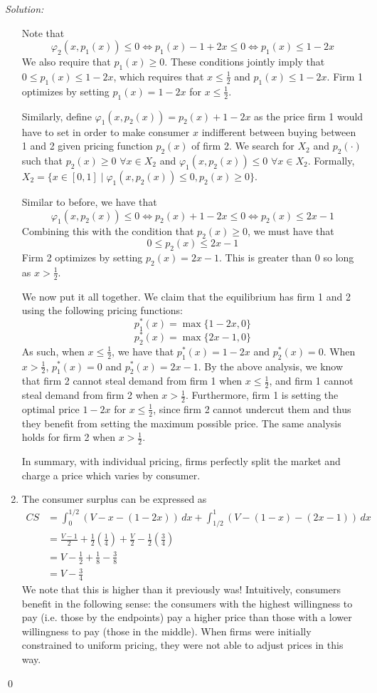\documentclass[12pt]{article}
\newenvironment{sol}
    {\emph{Solution:}
    }
    {
    \qed
    }
\begin{document}
\begin{sol}
\begin{enumerate}[label=\alph*) ]
        Note that
        \[\varphi_2(x, p_1(x)) \leq 0 \iff  p_1(x) - 1 + 2x \leq 0 \iff p_1(x) \leq 1 - 2x\]
        We also require that $p_1(x) \geq 0$. These conditions jointly imply that $0 \leq p_1(x) \leq 1-2x$, which requires that $x \leq \frac{1}{2}$ and $p_1(x) \leq 1-2x$. Firm 1 optimizes by setting $p_1(x) = 1-2x$ for $x \leq \frac{1}{2}$. 

        Similarly, define $\varphi_1(x, p_2(x)) = p_2(x) + 1 - 2x$ as the price firm 1 would have to set in order to make consumer $x$ indifferent between buying between 1 and 2 given pricing function $p_2(x)$ of firm 2. We search for $X_2$ and $p_2(\cdot)$ such that $p_2(x) \geq 0$ $\forall x \in X_2$ and $\varphi_1(x, p_2(x)) \leq 0$ $\forall x \in X_2$. Formally, $X_2 = \{x \in [0,1] \mid \varphi_1(x, p_2(x)) \leq 0, p_2(x) \geq 0\}$.

        Similar to before, we have that 
        \[\varphi_1(x, p_2(x)) \leq 0 \iff p_2(x) + 1 - 2x \leq 0 \iff p_2(x) \leq 2x - 1\]
        Combining this with the condition that $p_2(x) \geq 0$, we must have that
        \[0 \leq p_2(x) \leq 2x - 1\]
        Firm 2 optimizes by setting $p_2(x) = 2x-1$. This is greater than 0 so long as $x > \frac{1}{2}$. 

        We now put it all together. We claim that the equilibrium has firm 1 and 2 using the following pricing functions:
        \[p_1^*(x) = \max\{1 - 2x, 0\}\]
        \[p_2^*(x) = \max\{2x-1, 0\}\]
        As such, when $x \leq \frac{1}{2}$, we have that $p_1^*(x) = 1-2x$ and $p_2^*(x) = 0$. When $x > \frac{1}{2}$, $p_1^*(x) = 0$ and $p_2^*(x) = 2x-1$. By the above analysis, we know that firm 2 cannot steal demand from firm 1 when $x \leq \frac{1}{2}$, and firm 1 cannot steal demand from firm 2 when $x > \frac{1}{2}$. Furthermore, firm 1 is setting the optimal price $1 - 2x$ for $x \leq \frac{1}{2}$, since firm 2 cannot undercut them and thus they benefit from setting the maximum possible price. The same analysis holds for firm 2 when $x > \frac{1}{2}$.

        In summary, with individual pricing, firms perfectly split the market and charge a price which varies by consumer. 
        \item The consumer surplus can be expressed as
        \begin{align*}
            CS &= \int_{0}^{1/2} (V - x - (1-2x)) \, dx + \int_{1/2}^{1} (V - (1-x) - (2x-1))\, dx\\
                &= \frac{V - 1}{2} + \frac{1}{2}\left(\frac{1}{4}\right) + \frac{V}{2} - \frac{1}{2}\left(\frac{3}{4}\right)\\
                &= V - \frac{1}{2} + \frac{1}{8} - \frac{3}{8}\\
                &= V - \frac{3}{4}
        \end{align*}
        We note that this is higher than it previously was! Intuitively, consumers benefit in the following sense: the consumers with the highest willingness to pay (i.e. those by the endpoints) pay a higher price than those with a lower willingness to pay (those in the middle). When firms were initially constrained to uniform pricing, they were not able to adjust prices in this way.


\end{enumerate}
\end{sol}
\end{document}
